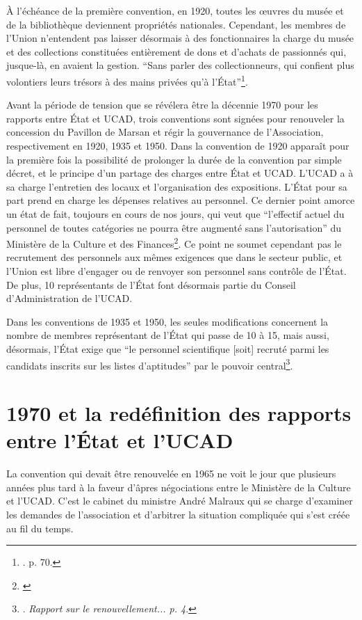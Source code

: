 À l’échéance de la première convention, en 1920, toutes les œuvres du musée et de la bibliothèque deviennent propriétés nationales. Cependant, les membres de l'Union n'entendent pas laisser désormais à des fonctionnaires la charge du musée et des collections constituées entièrement de dons et d'achats de passionnés qui, jusque-là, en avaient la gestion. \enquote{Sans parler des collectionneurs, qui confient plus volontiers leurs trésors à des mains privées qu'à l'État}\footnote{\cite{brunhammer_beau_1992}. p. 70.}. \hfill \break

Avant la période de tension que se révélera être la décennie 1970 pour les rapports entre État et UCAD, trois conventions sont signées pour renouveler la concession du Pavillon de Marsan et régir la gouvernance de l'Association, respectivement en 1920, 1935 et 1950. Dans la convention de 1920 apparaît pour la première fois la possibilité de prolonger la durée de la convention par simple décret, et le principe d'un partage des charges entre État et UCAD. L'UCAD a à sa charge l'entretien des locaux et l'organisation des expositions. L'État pour sa part prend en charge les dépenses relatives au personnel. Ce dernier point amorce un état de fait, toujours en cours de nos jours, qui veut que \enquote{l'effectif actuel du personnel de toutes catégories ne pourra être augmenté sans l'autorisation} du Ministère de la Culture et des Finances\footnote{\cite{noauthor__1970}}. Ce point ne soumet cependant pas le recrutement des personnels aux mêmes exigences que dans le secteur public, et l'Union est libre d'engager ou de renvoyer son personnel sans contrôle de l'État. De plus, 10 représentants de l'État font désormais partie du Conseil d'Administration de l'UCAD. 

Dans les conventions de 1935 et 1950, les seules modifications concernent la nombre de membres représentant de l'État qui passe de 10 à 15, mais aussi, désormais, l'État exige que \enquote{le personnel scientifique [soit] recruté parmi les candidats inscrits sur les listes d'aptitudes} par le pouvoir central\footnote{\cite{noauthor__1970}. \textit{Rapport sur le renouvellement... p. 4}.}.

\section{1970 et la redéfinition des rapports entre l'État et l'UCAD}

La convention qui devait être renouvelée en 1965 ne voit le jour que plusieurs années plus tard à la faveur d'âpres négociations entre le Ministère de la Culture et l'UCAD. C'est le cabinet du ministre André Malraux qui se charge d'examiner les demandes de l'association et d'arbitrer la situation compliquée qui s'est créée au fil du temps.

